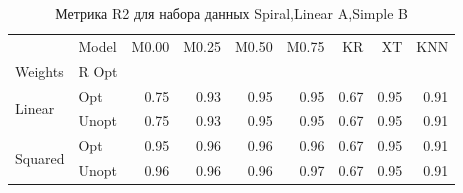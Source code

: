 \begin{table}
\caption{Метрика R2 для набора данных Spiral,Linear A,Simple B}
\label{tab:R2_Spiral,Linear A,Simple B}
\begin{tabular}{llrrrrrrr}
\toprule
 & Model & M0.00 & M0.25 & M0.50 & M0.75 & KR & XT & KNN \\
Weights & R Opt &  &  &  &  &  &  &  \\
\midrule
\multirow[t]{2}{*}{Linear} & Opt & 0.75 & 0.93 & 0.95 & 0.95 & 0.67 & 0.95 & 0.91 \\
 & Unopt & 0.75 & 0.93 & 0.95 & 0.95 & 0.67 & 0.95 & 0.91 \\

\multirow[t]{2}{*}{Squared} & Opt & 0.95 & 0.96 & 0.96 & 0.96 & 0.67 & 0.95 & 0.91 \\
 & Unopt & 0.96 & 0.96 & 0.96 & 0.97 & 0.67 & 0.95 & 0.91 \\

\bottomrule
\end{tabular}
\end{table}
